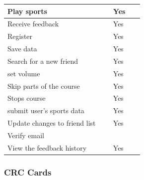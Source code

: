 \documentclass[a4paper]{article}
\begin{document}
\begin{table}[h!]
\begin{minipage}{\textwidth}
\begin{minipage}[t]{0.48\textwidth}
\begin{tabular}{|p{0.7\linewidth}|p{0.2\linewidth}|}
					\hline
					Play sports & Yes\\
					\hline
					Receive feedback & Yes\\
					\hline
					Register & Yes\\
					\hline
					Save data & Yes\\
					\hline
					Search for a new friend & Yes\\
					\hline
					set volume & Yes\\
					\hline
					Skip parts of the course & Yes\\
					\hline
					Stops course & Yes\\
					\hline
					submit user's sports data & Yes\\
					\hline
					Update changes to friend list & Yes\\
					\hline
					Verify email & \\
					\hline
					View the feedback history & Yes\\
					\hline
			 	\end{tabular}
		  	\end{minipage}
   		\end{minipage}
	\end{table}

	\subsubsection{CRC Cards}
	
\end{document}
